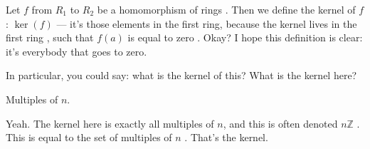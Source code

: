 \begin{speech}[00:32:06 - 00:32:56]
Let $f$ from $R_1$ to $R_2$  be a homomorphism of rings . Then we define the kernel of $f$: $\ker(f)$  --- it's those elements in the first ring, because the kernel lives in the first ring , such that $f(a)$ is equal to zero . Okay? I hope this definition is clear: it's everybody that goes to zero.

In particular, you could say: what is the kernel of this?  What is the kernel here?
\end{speech}

\begin{student}
Multiples of $n$.
\end{student}

\begin{speech}[00:32:57 - 00:33:17]
Yeah. The kernel here is exactly all multiples of $n$, and this is often denoted $n\mathbb{Z}$ . This is equal to the set of multiples of $n$ . That's the kernel.
\end{speech}

